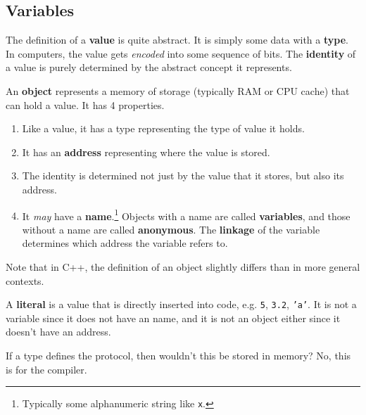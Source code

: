 \documentclass{article}
\begin{document}
  \subsection{Variables}

      \begin{definition}[Value]
        The definition of a \textbf{value} is quite abstract. It is simply some data with a \textbf{type}. In computers, the value gets \textit{encoded} into some sequence of bits. The \textbf{identity} of a value is purely determined by the abstract concept it represents. 
      \end{definition}

      \begin{definition}
        An \textbf{object} represents a memory of storage (typically RAM or CPU cache) that can hold a value. It has 4 properties. 
        \begin{enumerate}
          \item Like a value, it has a type representing the type of value it holds. 
          \item It has an \textbf{address} representing where the value is stored.  
          \item The identity is determined not just by the value that it stores, but also its address. 
          \item It \textit{may} have a \textbf{name}.\footnote{Typically some alphanumeric string like \texttt{x}.} Objects with a name are called \textbf{variables}, and those without a name are called \textbf{anonymous}. The \textbf{linkage} of the variable determines which address the variable refers to. 
        \end{enumerate}
        Note that in C++, the definition of an object slightly differs than in more general contexts. 
      \end{definition} 

      \begin{definition}[Literal]
        A \textbf{literal} is a value that is directly inserted into code, e.g. \texttt{5}, \texttt{3.2}, \texttt{'a'}. It is not a variable since it does not have an name, and it is not an object either since it doesn't have an address. 
      \end{definition} 

      \begin{theorem}
        If a type defines the protocol, then wouldn't this be stored in memory? No, this is for the compiler.  
      \end{theorem}
\end{document}
